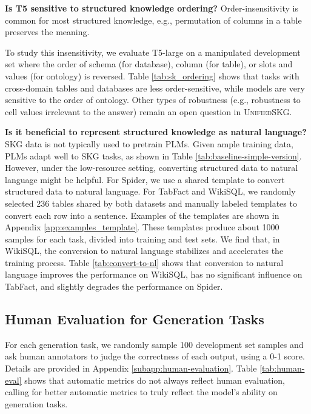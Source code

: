 \textbf{Is T5 sensitive to structured knowledge ordering?} Order-insensitivity is common for most structured knowledge, e.g., permutation of columns in a table preserves the meaning. 

To study this insensitivity, we evaluate T5-large on a manipulated development set where the order of schema (for database), column (for table), or slots and values (for ontology) is reversed. Table \ref{tab:sk_ordering} shows that tasks with cross-domain tables and databases are less order-sensitive, while models are very sensitive to the order of ontology. Other types of robustness (e.g., robustness to cell values irrelevant to the answer) remain an open question in \textsc{Unified}SKG. 

\textbf{Is it beneficial to represent structured knowledge as natural language?} SKG data is not typically used to pretrain PLMs. Given ample training data, PLMs adapt well to SKG tasks, as shown in Table \ref{tab:baseline-simple-version}. However, under the low-resource setting, converting structured data to natural language might be helpful. For Spider, we use a shared template to convert structured data to natural language. For TabFact and WikiSQL, we randomly selected 236 tables shared by both datasets and manually labeled templates to convert each row into a sentence. Examples of the templates are shown in Appendix \ref{app:examples_template}. These templates produce about 1000 samples for each task, divided into training and test sets. We find that, in WikiSQL, the conversion to natural language stabilizes and accelerates the training process. Table \ref{tab:convert-to-nl} shows that conversion to natural language improves the performance on WikiSQL, has no significant influence on TabFact, and slightly degrades the performance on Spider.



\subsection{Human Evaluation for Generation Tasks}
\label{subsec:human-eval}
For each generation task, we randomly sample 100 development set samples and ask human annotators to judge the correctness of each output, using a 0-1 score. Details are provided in Appendix \ref{subapp:human-evaluation}. 
Table \ref{tab:human-eval} shows that automatic metrics do not always reflect human evaluation, calling for better automatic metrics to truly reflect the model's ability on generation tasks. 

